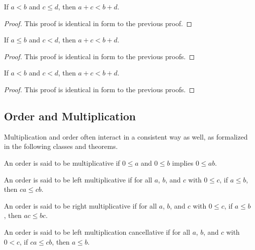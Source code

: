 \documentclass[../math.tex]{subfiles}
\begin{document}
\begin{theorem} \label{lt_le_lrplus}
    If $a < b$ and $c \leq d$, then $a + c < b + d$.
\end{theorem}
\begin{proof}
    This proof is identical in form to the previous proof.
\end{proof}

\begin{theorem} \label{le_lt_lrplus}
    If $a \leq b$ and $c < d$, then $a + c < b + d$.
\end{theorem}
\begin{proof}
    This proof is identical in form to the previous proofs.
\end{proof}

\begin{theorem} \label{lt_lrplus}
    If $a < b$ and $c < d$, then $a + c < b + d$.
\end{theorem}
\begin{proof}
    This proof is identical in form to the previous proofs.
\end{proof}

\subsection{Order and Multiplication}

Multiplication and order often interact in a consistent way as well, as
formalized in the following classes and theorems.

\begin{class}
    An order is said to be multiplicative if $0 \leq a$ and $0 \leq b$ implies
    $0 \leq ab$.
\end{class}

\begin{class}
    An order is said to be left multiplicative if for all $a$, $b$, and $c$ with
    $0 \leq c$, if $a \leq b$, then $ca \leq cb$.
\end{class}

\begin{class}
    An order is said to be right multiplicative if for all $a$, $b$, and $c$
    with $0 \leq c$, if $a \leq b$, then $ac \leq bc$.
\end{class}

\begin{class}
    An order is said to be left multiplication cancellative if for all $a$, $b$,
    and $c$ with $0 < c$, if $ca \leq cb$, then $a \leq b$.
\end{class}
\end{document}
